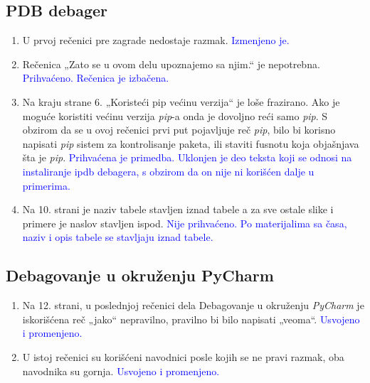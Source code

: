 \documentclass[a4paper]{report}
\newcommand{\odgovor}[1]{\textcolor{blue}{#1}}
\begin{document}
\subsection{PDB debager}
\begin{enumerate}
    \item U prvoj rečenici pre zagrade nedostaje razmak.
    \odgovor{Izmenjeno je.}
    \item Rečenica „Zato se u ovom delu upoznajemo sa njim.“ je nepotrebna.
    \odgovor{Prihvaćeno. Rečenica je izbačena.}
    \item Na kraju strane 6. „Koristeći pip većinu verzija“ je loše frazirano. Ako je moguće koristiti većinu verzija \emph{pip}-a  onda je dovoljno reći samo \emph{pip}. S obzirom da se u ovoj rečenici prvi put pojavljuje reč \emph{pip}, bilo bi korisno napisati \emph{pip} sistem za kontrolisanje paketa, ili staviti fusnotu koja objašnjava šta je \emph{pip}.
    \odgovor{Prihvaćena je primedba. Uklonjen je deo teksta koji se odnosi na instaliranje ipdb debagera, s obzirom da on nije ni korišćen dalje u primerima.}
    \item Na 10. strani je naziv tabele stavljen iznad tabele a za sve ostale slike i primere je naslov stavljen ispod.
    \odgovor{Nije prihvaćeno. Po materijalima sa časa, naziv i opis tabele se stavljaju iznad tabele.}
\end{enumerate}
\subsection{Debagovanje u okruženju PyCharm}
\begin{enumerate}
    \item Na 12. strani, u poslednjoj rečenici dela Debagovanje u okruženju \emph{PyCharm} je iskorišćena reč „jako“ nepravilno, pravilno bi bilo napisati „veoma“.
    \odgovor{Usvojeno i promenjeno.}
    \item U istoj rečenici su korišćeni navodnici posle kojih se ne pravi razmak, oba navodnika su gornja.
    \odgovor{Usvojeno i promenjeno.}
\end{enumerate}
\end{document}
